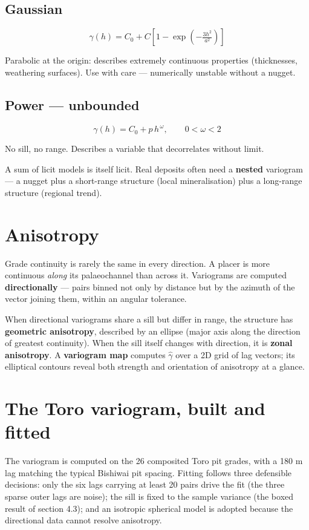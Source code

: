 \documentclass[11pt]{article}
\begin{document}
\subsection*{Gaussian}
\begin{eqbox}
\[ \gamma(h)=C_0+C\left[1-\exp\!\left(-\tfrac{3h^{2}}{a^{2}}\right)
   \right] \tag{4.9}\]
\end{eqbox}
Parabolic at the origin: describes extremely continuous properties
(thicknesses, weathering surfaces). Use with care --- numerically
unstable without a nugget.

\subsection*{Power --- unbounded}
\begin{eqbox}
\[ \gamma(h)=C_0+p\,h^{\,\omega},\qquad 0<\omega<2 \tag{4.10}\]
\end{eqbox}
No sill, no range. Describes a variable that decorrelates without limit.

A sum of licit models is itself licit. Real deposits often need a
\textbf{nested} variogram --- a nugget plus a short-range structure
(local mineralisation) plus a long-range structure (regional trend).

\section{Anisotropy}

Grade continuity is rarely the same in every direction. A placer is more
continuous \emph{along} its palaeochannel than across it. Variograms are
computed \textbf{directionally} --- pairs binned not only by distance
but by the azimuth of the vector joining them, within an angular
tolerance.

When directional variograms share a sill but differ in range, the
structure has \textbf{geometric anisotropy}, described by an ellipse
(major axis along the direction of greatest continuity). When the sill
itself changes with direction, it is \textbf{zonal anisotropy}. A
\textbf{variogram map} computes $\hat\gamma$ over a 2D grid of lag
vectors; its elliptical contours reveal both strength and orientation of
anisotropy at a glance.

\section{The Toro variogram, built and fitted}

The variogram is computed on the 26 composited Toro pit grades, with a
180 m lag matching the typical Bishiwai pit spacing. Fitting follows three
defensible decisions: only the six lags carrying at least 20 pairs drive
the fit (the three sparse outer lags are noise); the sill is fixed to the
sample variance (the boxed result of section 4.3); and an isotropic
spherical model is adopted because the directional data cannot resolve
anisotropy.
\end{document}
